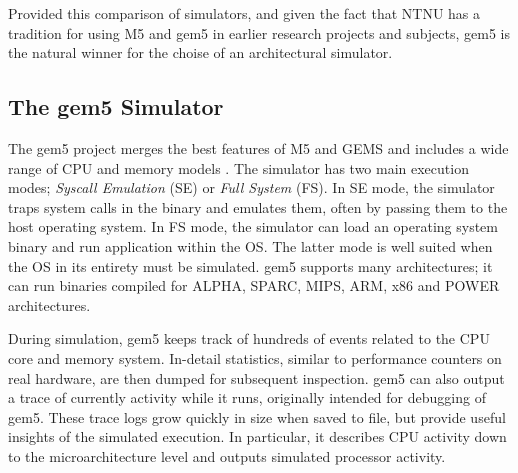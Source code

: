 Provided this comparison of simulators, and given the fact that NTNU has a tradition
for using M5 and gem5 in earlier research projects and subjects, gem5 is the natural
winner for the choise of an architectural simulator.


\subsection{The gem5 Simulator}

The gem5 project \cite{gem5} merges the best features of M5 \cite{binkert2006m5}
and GEMS \cite{GEMS} and includes a wide range of CPU and memory models
\cite{gem5hipeac}. The simulator has two main execution modes; \textit{Syscall
Emulation} (SE) or \textit{Full System} (FS). In SE mode, the simulator traps
system calls in the binary and emulates them, often by passing them to the host
operating system. In FS mode, the simulator can load an operating system binary
and run application within the OS. The latter mode is well suited when the OS in
its entirety must be simulated. gem5 supports many architectures; it can run
binaries compiled for ALPHA, SPARC, MIPS, ARM, x86 and POWER architectures.

During simulation, gem5 keeps track of hundreds of events related to the CPU
core and memory system. In-detail statistics, similar to performance counters on
real hardware, are then dumped for subsequent inspection. gem5 can also output a
trace of currently activity while it runs, originally intended for debugging of
gem5. These trace logs grow quickly in size when saved to file, but provide useful
insights of the simulated execution. In particular, it describes CPU activity
down to the microarchitecture level and outputs simulated processor activity.

